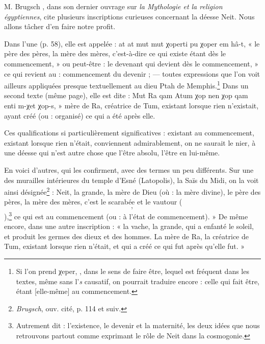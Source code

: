 \documentclass[a4paper, 11pt, oneside]{article}
\newcommand*\hieroAAKO{}
\newcommand*\hieroAAXY{}
\begin{document}
M. Brugsch , dans son dernier ouvrage sur \emph{la Mythologie et la religion égyptiennes}, cite plusieurs inscriptions curieuses concernant la déesse Neit. Nous allons tâcher d'en faire notre profit.

Dans l'une (p. 58), elle est appelée : at at mut mut χoperti pu χoper em hâ-t, « le père des pères, la mère des mères, c'est-à-dire ce qui existe étant dès le commencement, » ou peut-être : le devenant qui devient dès le commencement, » ce qui revient au : commencement du devenir ; --- toutes expressions que l'on voit ailleurs appliquées presque textuellement au dieu Ptah de Memphis.\footnote{Si l'on prend χeper, $\hieroAAXY$, dans le sens de faire être, lequel est fréquent dans les textes, même sans l'\emph{s} causatif, on pourrait traduire encore : celle qui fait être, étant [elle-même] au commencement.} Dans un second texte (même page), elle est dite : Mut Ra qam Atum χop nen χop qam enti m-χet χop-s, » mère de Ra, créatrice de Tum, existant lorsque rien n'existait, ayant créé (ou : organisé) ce qui a été après elle.

Ces qualifications si particulièrement significatives : existant au commencement, existant lorsque rien n'était, conviennent admirablement, on ne saurait le nier, à une déesse qui n'est autre chose que l'être absolu, l'être en lui-même.

En voici d'autres, qui les confirment, avec des termes un peu différents. Sur une des murailles intérieures du temple d'Esné (Latopolis), la Saïs du Midi, on la voit ainsi désignée\footnote{\emph{Brugsch}, ouv. cité, p. 114 et suiv.} : Neit, la grande, la mère de Dieu (où : la mère divine), le père des pères, la mère des mères, c'est le scarabée et le vautour ($\hieroAAXY$, $\hieroAAKO$),\footnote{Autrement dit : l'existence, le devenir et la maternité, les deux idées que nous retrouvons partout comme exprimant le rôle de Neit dans la cosmogonie.} ce qui est au commencement (ou : à l'état de commencement). » De même encore, dans une autre inscription : « la vache, la grande, qui a enfanté le soleil, et produit les germes des dieux et des hommes. La mère de Ra, la créatrice de Tum, existant lorsque rien n'était, et qui a créé ce qui fut après qu'elle fut. »
\end{document}
